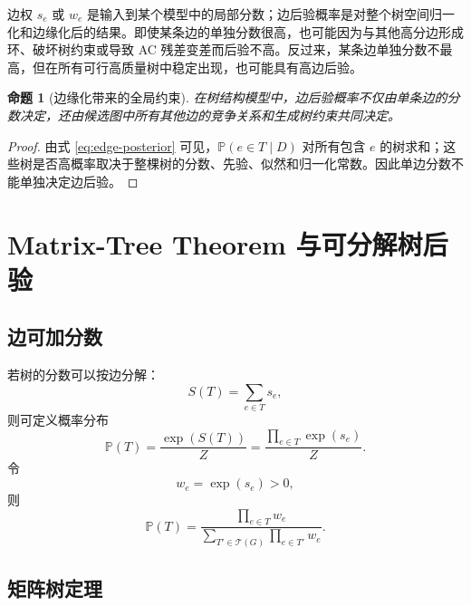 \documentclass[UTF8,12pt,openany]{ctexrep}
\numberwithin{equation}{chapter}
\theoremstyle{definition}
\theoremstyle{plain}
\newtheorem{proposition}[theorem]{命题}
\newcommand{\Prob}{\mathbb{P}}
\newcommand{\Tcal}{\mathcal{T}}
\begin{document}
边权 $s_e$ 或 $w_e$ 是输入到某个模型中的局部分数；边后验概率是对整个树空间归一化和边缘化后的结果。即使某条边的单独分数很高，也可能因为与其他高分边形成环、破坏树约束或导致 AC 残差变差而后验不高。反过来，某条边单独分数不最高，但在所有可行高质量树中稳定出现，也可能具有高边后验。

\begin{proposition}[边缘化带来的全局约束]
在树结构模型中，边后验概率不仅由单条边的分数决定，还由候选图中所有其他边的竞争关系和生成树约束共同决定。
\end{proposition}

\begin{proof}
由式 \eqref{eq:edge-posterior} 可见，$\Prob(e\in T\mid D)$ 对所有包含 $e$ 的树求和；这些树是否高概率取决于整棵树的分数、先验、似然和归一化常数。因此单边分数不能单独决定边后验。
\end{proof}

\chapter{Matrix-Tree Theorem 与可分解树后验}

\section{边可加分数}

若树的分数可以按边分解：
\begin{equation}
S(T)=\sum_{e\in T}s_e,
\label{eq:additive-tree-score}
\end{equation}
则可定义概率分布
\begin{equation}
\Prob(T)=\frac{\exp(S(T))}{Z}
=
\frac{\prod_{e\in T}\exp(s_e)}{Z}.
\label{eq:edge-factor-tree}
\end{equation}
令
\begin{equation}
w_e=\exp(s_e)>0,
\end{equation}
则
\begin{equation}
\Prob(T)
=
\frac{\prod_{e\in T}w_e}
{\sum_{T'\in\Tcal(G)}\prod_{e\in T'}w_e}.
\label{eq:weighted-tree-distribution}
\end{equation}

\section{矩阵树定理}
\end{document}
